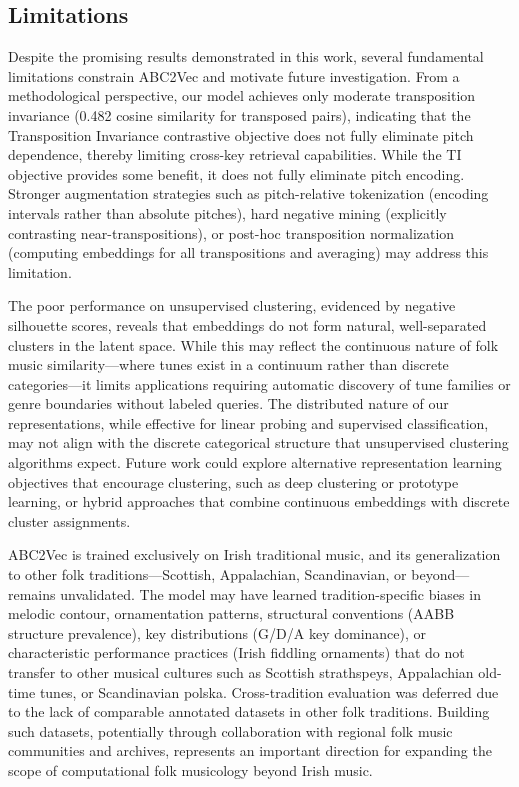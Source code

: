 \documentclass[]{interact}
\theoremstyle{plain}
\theoremstyle{definition}
\theoremstyle{remark}
\begin{document}
\subsection{Limitations}

Despite the promising results demonstrated in this work, several fundamental limitations constrain ABC2Vec and motivate future investigation. From a methodological perspective, our model achieves only moderate transposition invariance (0.482 cosine similarity for transposed pairs), indicating that the Transposition Invariance contrastive objective does not fully eliminate pitch dependence, thereby limiting cross-key retrieval capabilities. While the TI objective provides some benefit, it does not fully eliminate pitch encoding. Stronger augmentation strategies such as pitch-relative tokenization (encoding intervals rather than absolute pitches), hard negative mining (explicitly contrasting near-transpositions), or post-hoc transposition normalization (computing embeddings for all transpositions and averaging) may address this limitation.

The poor performance on unsupervised clustering, evidenced by negative silhouette scores, reveals that embeddings do not form natural, well-separated clusters in the latent space. While this may reflect the continuous nature of folk music similarity—where tunes exist in a continuum rather than discrete categories—it limits applications requiring automatic discovery of tune families or genre boundaries without labeled queries. The distributed nature of our representations, while effective for linear probing and supervised classification, may not align with the discrete categorical structure that unsupervised clustering algorithms expect. Future work could explore alternative representation learning objectives that encourage clustering, such as deep clustering or prototype learning, or hybrid approaches that combine continuous embeddings with discrete cluster assignments.

ABC2Vec is trained exclusively on Irish traditional music, and its generalization to other folk traditions—Scottish, Appalachian, Scandinavian, or beyond—remains unvalidated. The model may have learned tradition-specific biases in melodic contour, ornamentation patterns, structural conventions (AABB structure prevalence), key distributions (G/D/A key dominance), or characteristic performance practices (Irish fiddling ornaments) that do not transfer to other musical cultures such as Scottish strathspeys, Appalachian old-time tunes, or Scandinavian polska. Cross-tradition evaluation was deferred due to the lack of comparable annotated datasets in other folk traditions. Building such datasets, potentially through collaboration with regional folk music communities and archives, represents an important direction for expanding the scope of computational folk musicology beyond Irish music.
\end{document}
